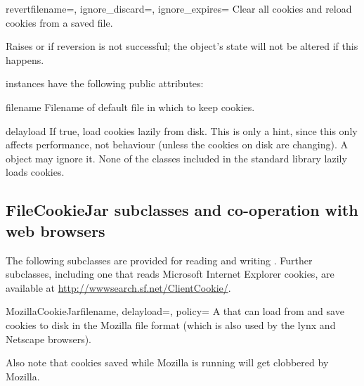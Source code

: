 \begin{methoddesc}[FileCookieJar]{revert}{filename=,
    ignore_discard=, ignore_expires=}
Clear all cookies and reload cookies from a saved file.

Raises  or  if
reversion is not successful; the object's state will not be altered if
this happens.
\end{methoddesc}

 instances have the following public attributes:

\begin{memberdesc}{filename}
Filename of default file in which to keep cookies.
\end{memberdesc}

\begin{memberdesc}{delayload}
If true, load cookies lazily from disk.  This is only a hint, since
this only affects performance, not behaviour (unless the cookies on
disk are changing).  A  object may ignore it.  None
of the  classes included in the standard library
lazily loads cookies.
\end{memberdesc}


\subsection{FileCookieJar subclasses and co-operation with web browsers
  \label{file-cookie-jar-classes}}

The following  subclasses are provided for reading
and writing .  Further  subclasses, including one
that reads Microsoft Internet Explorer cookies, are available at
\url{http://wwwsearch.sf.net/ClientCookie/}.

\begin{classdesc}{MozillaCookieJar}{filename, delayload=,
 policy=}
A  that can load from and save cookies to disk in
the Mozilla  file format (which is also used by the
lynx and Netscape browsers).  


Also note that cookies saved while Mozilla is running will get
clobbered by Mozilla.
\end{classdesc}


